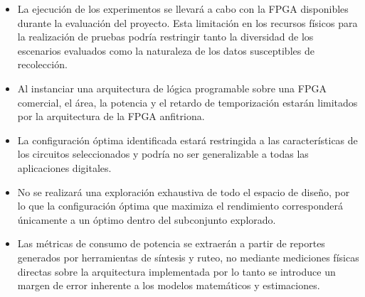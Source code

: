 \begin{itemize}

    \item La ejecución de los experimentos se llevará a cabo con la FPGA 
    disponibles durante la evaluación del proyecto. Esta limitación en los recursos 
    físicos para la realización de pruebas podría restringir tanto la diversidad de 
    los escenarios evaluados como la naturaleza de los datos susceptibles de recolección.

    \item Al instanciar una arquitectura de lógica programable sobre una FPGA comercial, 
    el área, la potencia y el retardo de temporización estarán limitados por la arquitectura 
    de la FPGA anfitriona.

    \item La configuración óptima identificada estará restringida a las características 
    de los circuitos seleccionados y podría no ser generalizable a todas las aplicaciones 
    digitales.

    \item No se realizará una exploración exhaustiva de todo el espacio de diseño, por lo 
    que la configuración óptima que maximiza el rendimiento corresponderá únicamente a un 
    óptimo dentro del subconjunto explorado.

    \item Las métricas de consumo de potencia se extraerán a partir de reportes generados 
    por herramientas de síntesis y ruteo, no mediante mediciones físicas directas sobre 
    la arquitectura implementada por lo tanto se introduce un margen de error inherente a 
    los modelos matemáticos y estimaciones.



\end{itemize}